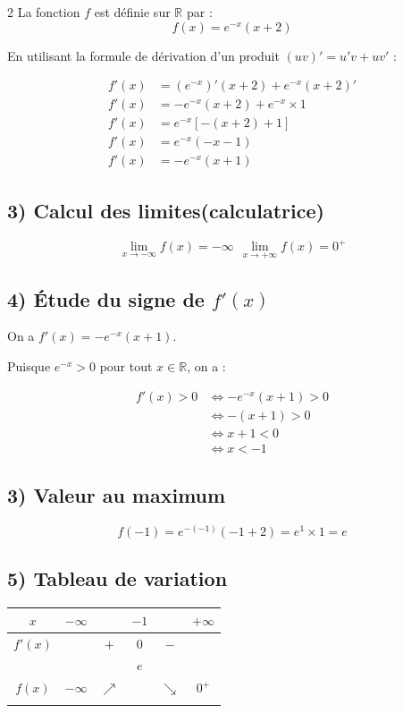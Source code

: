 \documentclass[11pt,a4paper]{article}
\begin{document}
\begin{tcolorbox}[colback=red!5!white,colframe=red!75!black]
\begin{multicols}{2}
La fonction $f$ est définie sur $\mathbb{R}$ par :
$$f(x) = e^{-x}(x+2)$$

En utilisant la formule de dérivation d'un produit $(uv)' = u'v + uv'$ :

\begin{align*}
f'(x) &= \left(e^{-x}\right)'(x+2) + e^{-x}(x+2)' \\
f'(x) &= -e^{-x}(x+2) + e^{-x} \times 1 \\
f'(x) &= e^{-x}\left[-(x+2) + 1\right] \\
f'(x) &= e^{-x}(-x-1) \\
f'(x) &= -e^{-x}(x+1)
\end{align*}

\subsection*{3) Calcul des limites(calculatrice)}

$$\lim_{x \to -\infty} f(x) =-\infty ~~\lim_{x \to +\infty} f(x) =  0^+$$

\subsection*{4) Étude du signe de $f'(x)$}

On a $f'(x) = -e^{-x}(x+1)$.

Puisque $e^{-x} > 0$ pour tout $x \in \mathbb{R}$, on a :

\begin{align*}
f'(x) > 0 &\iff -e^{-x}(x+1) > 0 \\
&\iff -(x+1) > 0 \\
&\iff x+1 < 0 \\
&\iff x < -1
\end{align*}

\subsection*{3) Valeur au maximum}

$$f(-1) = e^{-(-1)}(-1+2) = e^1 \times 1 = e$$

\subsection*{5) Tableau de variation}

\begin{center}
\begin{tabular}{|c|ccccc|}
\hline
$x$ & $-\infty$ & & $-1$ & & $+\infty$ \\
\hline
$f'(x)$ & & $+$ & $0$ & $-$ & \\
\hline
& & & $e$ & & \\
$f(x)$ & $-\infty$ & $\nearrow$ & & $\searrow$ & $0^+$ \\
& & & & & \\
\hline
\end{tabular}
\end{center}


\end{multicols}
\end{tcolorbox}
\end{document}
